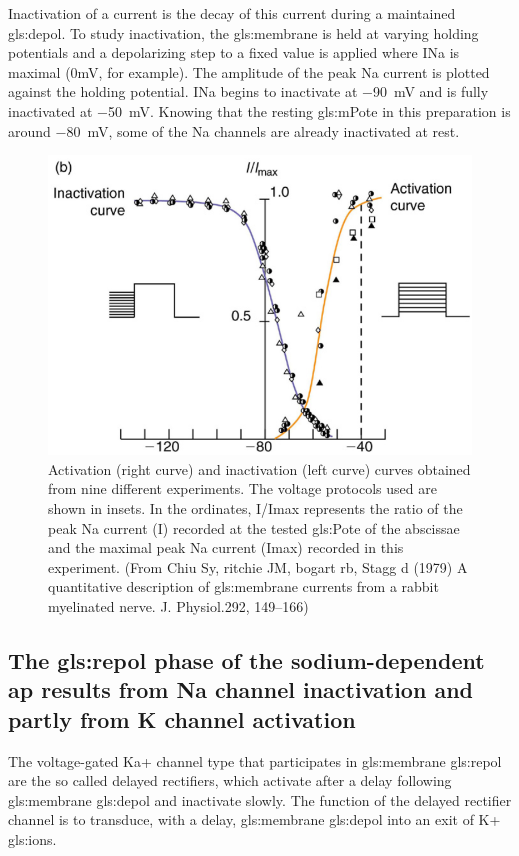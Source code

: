 \documentclass[../../Orator]{subfiles}
\begin{document}
Inactivation of a current is the decay of this current during a maintained \gls{gls:depol}. To study inactivation, the \gls{gls:membrane} is held at varying holding potentials and a depolarizing step to a fixed value is applied where INa is maximal (0mV, for example). The amplitude of the peak \gls{Na} current is plotted against the holding potential. INa begins to inactivate at \qty{-90}{\mV} and is fully inactivated at \qty{-50}{\mV}. Knowing that the resting \gls{gls:mPote} in this preparation is around \qty{-80}{\mV}, some of the \gls{Na} channels are already inactivated at rest. 
\begin{figure}[H]
    \centering
    \includegraphics[width=0.5\linewidth]{Pictures//Anakin/activ-inactiv.png}
    \caption{Activation (right curve) and inactivation (left curve) curves obtained from nine different experiments. The voltage protocols used are shown in insets. In the ordinates, I/Imax represents the ratio of the peak \gls{Na} current (I) recorded at the tested \gls{gls:Pote} of the abscissae and the maximal peak \gls{Na} current (Imax) recorded in this experiment. (From Chiu Sy, ritchie JM, bogart rb, Stagg d (1979) A quantitative description of \gls{gls:membrane} currents from a rabbit myelinated nerve. J. Physiol.292, 149–166) }
    \label{fig:enter-label}
\end{figure}

\subsection{The \gls{gls:repol} phase of the sodium-dependent \gls{ap} results from  \gls{Na} channel inactivation and partly from  \gls{K} channel activation}

The voltage-gated Ka+ channel type that participates in \gls{gls:membrane} \gls{gls:repol} are the so called delayed rectifiers, which activate after a delay following \gls{gls:membrane} \gls{gls:depol} and inactivate slowly. The function of the delayed rectifier channel is to transduce, with a delay, \gls{gls:membrane} \gls{gls:depol} into an exit of K+ \glspl{gls:ion}. 
\end{document}

